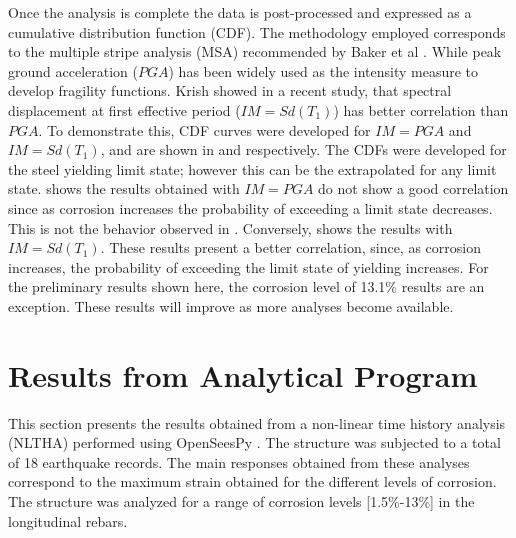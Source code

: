 Once the analysis is complete the data is post-processed and expressed as a cumulative distribution function (CDF). The methodology employed corresponds to the multiple stripe analysis (MSA) recommended by Baker et al \cite{Baker2015}. While peak ground acceleration ($PGA$) has been widely used as the intensity measure to develop fragility functions\cite{Ghosh2015}\cite{Bisadi2015}\cite{Shekhar2018}. Krish \cite{Krish2018} showed in a recent study, that spectral displacement at first effective period ($IM=Sd(T_1)$) has better correlation than $PGA$. To demonstrate this, CDF curves were developed for $IM=PGA$ and $IM=Sd(T_1)$, and are shown in  and  respectively. The CDFs were developed for the steel yielding limit state; however this can be the extrapolated for any limit state.  shows the results obtained with $IM=PGA$ do not show a good correlation since as corrosion increases the probability of exceeding a limit state decreases. This is not the behavior observed in . Conversely,  shows the results with $IM=Sd(T_1)$. These results present a better correlation, since, as corrosion increases, the probability of exceeding the limit state of yielding increases. For the preliminary results shown here, the corrosion level of 13.1\% results are an exception. These results will improve as more analyses become available. 

%
%
\section{Results from Analytical Program}
This section presents the results obtained from a non-linear time history analysis (NLTHA) performed using OpenSeesPy \cite{Zhu2018}. The structure was subjected to a total of 18 earthquake records. The main responses obtained from these analyses correspond to the maximum strain obtained for the different levels of corrosion. The structure was analyzed for a range of corrosion levels [1.5\%-13\%] in the longitudinal rebars.

